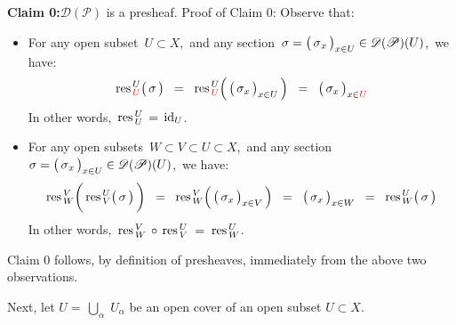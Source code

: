 \vskip 0.5cm
\noindent
\textbf{Claim 0:}\quad $\mathscr{D}(\mathscr{P})$ is a presheaf.
\vskip 0.2cm
\noindent
Proof of Claim 0:\;\; Observe that:
\begin{itemize}
\item
	For any open subset \,$U \subset X$,\, and any section
	\,$\sigma = \left(\,\overset{{\color{white}.}}{\sigma}_{x}\,\right)_{x \in U} \in \mathscr{D}(\mathscr{P})(U)$,\,
	we have:
	\begin{equation*}
	\res^{\,U}_{\,{\color{red}U}}\!\left(\,\overset{{\color{white}.}}{\sigma}\,\right)
	\;\; = \;\;
		\res^{\,U}_{\,{\color{red}U}}\!\left(\,\left(\,\overset{{\color{white}.}}{\sigma_{x}}\,\right)_{x \in U}\,\right)
	\;\; = \;\;
		\left(\,\overset{{\color{white}.}}{\sigma_{x}}\,\right)_{x \in {\color{red}U}}
	\end{equation*}
	In other words, \,$\textnormal{res}^{\,U}_{\,U} \,=\, \textnormal{id}_{U}$.
\item
	For any open subsets \,$W \subset V \subset U \subset X$,\, and any section
	\,$\sigma = \left(\,\overset{{\color{white}.}}{\sigma}_{x}\,\right)_{x \in U} \in \mathscr{D}(\mathscr{P})(U)$,\,
	we have:
	\begin{equation*}
	\res^{\,V}_{\,W}\!\left(\,
		\overset{{\color{white}\textnormal{\large$.$}}}{\res^{\,U}_{\,V}}
		\!\left(\,\overset{{\color{white}.}}{\sigma}\,\right)
		\,\right)
	\;\; = \;\;
		\res^{\,V}_{\,W}\!\left(\,\left(\,\overset{{\color{white}.}}{\sigma_{x}}\,\right)_{x \in V}\,\right)
	\;\; = \;\;
		\left(\,\overset{{\color{white}.}}{\sigma_{x}}\,\right)_{x \in W}
	\;\; = \;\;
		\res^{\,U}_{\,W}\!\left(\,\overset{{\color{white}.}}{\sigma}\,\right)
	\end{equation*}
	In other words, \,$\textnormal{res}^{\,V}_{\,W} \,\circ\, \textnormal{res}^{\,U}_{\,V} \; = \; \textnormal{res}^{\,U}_{\,W}$.
\end{itemize} 
Claim 0 follows, by definition of presheaves, immediately from the above two observations.

\vskip 0.5cm
\noindent
Next, let $U = \,\underset{\alpha}{\bigcup}\;U_{\alpha}$ be an open cover of an open subset $U \subset X$.

